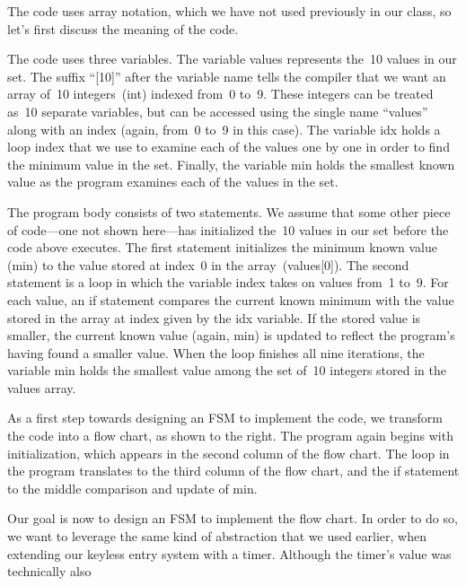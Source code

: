 The code uses array notation, which we have not used previously in our 
class, so let's first discuss the meaning of the code.

The code uses three variables.
%
The variable {\tfix values} represents the~10 values in our set.
The suffix ``[10]'' after the variable name tells the compiler that
we want an array of~10 integers~({\tfix int}) indexed from~0 to~9.
These integers can be treated as~10 separate variables, but can be
accessed using the single name ``{\tfix values}'' along with an index
(again, from~0 to~9 in this case).
%
The variable {\tfix idx} holds a loop index that we use to examine each
of the values one by one in order to find the minimum value in the set.
%
Finally, the variable {\tfix min} holds the smallest known value as 
the program examines each of the values in the set.

The program body consists of two statements.  
%
We assume that some other piece of code---one not shown here---has 
initialized the~10 values in our set before the code above executes.
%
The first statement initializes the
minimum known value ({\tfix min}) to the value stored at index~0 in the 
array~({\tfix values[0]}).
The second statement is a loop in which the variable {\tfix index} 
takes on values from~1 to~9.  For each value, an {\tfix if} statement
compares the current
known minimum with the value stored in the array at index given by the
{\tfix idx} variable.  If the stored value is smaller, the current known 
value (again, {\tfix min}) is updated to reflect the program's
having found a smaller value.  When the loop finishes all nine iterations,
the variable {\tfix min} holds the smallest value among the set of~10 
integers stored in the {\tfix values} array.

\begin{minipage}{2.47in}
As a first step towards designing an FSM to implement the code, we transform
the code into a flow chart, as shown to the right.  The program again begins
with initialization, which appears in the second column of the flow chart.  
The loop in the program translates to the third column of the flow chart, 
and the {\tfix if} statement to the middle comparison and update 
of {\tfix min}.\mpline

Our goal is now to design an FSM to implement the flow chart.  In order
to do so, we want to leverage the same kind of abstraction that we used
earlier, when extending our keyless entry system with a timer.  Although the
timer's value was technically also\linebreak\mpdone
\end{minipage}\hspace{.25in}%
\begin{minipage}{3.78in}
\centerline{}
\end{minipage}

